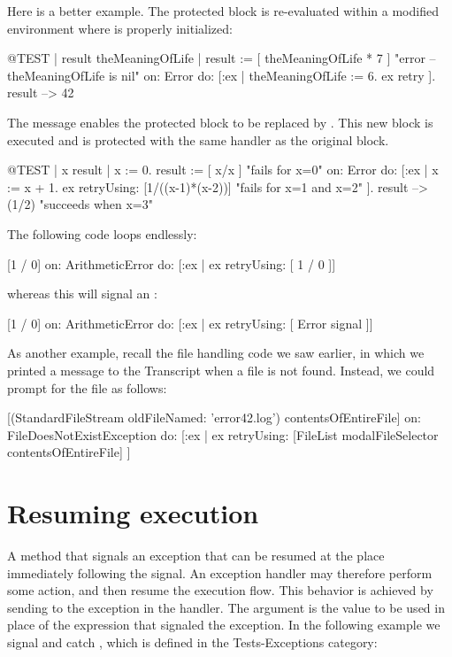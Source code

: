\documentclass[a4paper,10pt,twoside]{book}
\begin{document}
Here is a better example.
The protected block is re-evaluated within a modified environment where  is properly initialized:
\begin{code}{@TEST | result theMeaningOfLife |}
result := [ theMeaningOfLife * 7 ]    "error -- theMeaningOfLife is nil"
	on: Error
	do: [:ex | theMeaningOfLife := 6. ex retry ].
result --> 42
\end{code}

The message  enables the protected block to be replaced by . This new block is executed and is protected with the same handler as the original block.

\begin{code}{@TEST | x result |}
x := 0.
result := [ x/x ]    "fails for x=0"
	on: Error
	do: [:ex |
		x := x + 1.
		ex retryUsing: [1/((x-1)*(x-2))]    "fails for x=1 and x=2"
	].
result --> (1/2)    "succeeds when x=3"
\end{code}

The following code loops endlessly:
\begin{code}{}
[1 / 0] on: ArithmeticError do: [:ex | ex retryUsing: [ 1 / 0 ]]
\end{code}
whereas this will signal an : 
\begin{code}{}
[1 / 0] on: ArithmeticError do: [:ex | ex retryUsing: [ Error signal ]]
\end{code}

As another example, recall the file handling code we saw earlier, in which we printed a message to the Transcript when a file is not found. Instead, we could prompt for the file as follows:
\begin{code}{}
[(StandardFileStream oldFileNamed: 'error42.log') contentsOfEntireFile]
	on: FileDoesNotExistException
	do: [:ex | ex retryUsing: [FileList modalFileSelector contentsOfEntireFile] ]
\end{code}

\section{Resuming execution}

A method that signals an exception that  can be resumed at the place immediately following the signal. An exception handler may therefore perform some action, and then resume the execution flow. This behavior is achieved by sending  to the exception in the handler.
The argument is the value to be used in place of the expression that signaled the exception.
In the following example we signal and catch , which is defined in the Tests-Exceptions category:
\end{document}

